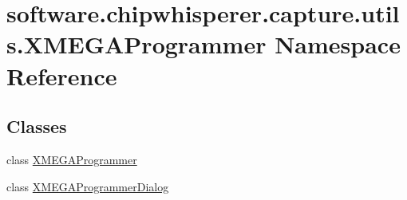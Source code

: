 \hypertarget{namespacesoftware_1_1chipwhisperer_1_1capture_1_1utils_1_1XMEGAProgrammer}{}\section{software.\+chipwhisperer.\+capture.\+utils.\+X\+M\+E\+G\+A\+Programmer Namespace Reference}
\label{namespacesoftware_1_1chipwhisperer_1_1capture_1_1utils_1_1XMEGAProgrammer}
\subsection*{Classes}
\begin{DoxyCompactItemize}
\item 
class \hyperlink{classsoftware_1_1chipwhisperer_1_1capture_1_1utils_1_1XMEGAProgrammer_1_1XMEGAProgrammer}{X\+M\+E\+G\+A\+Programmer}
\item 
class \hyperlink{classsoftware_1_1chipwhisperer_1_1capture_1_1utils_1_1XMEGAProgrammer_1_1XMEGAProgrammerDialog}{X\+M\+E\+G\+A\+Programmer\+Dialog}
\end{DoxyCompactItemize}
